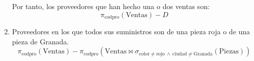 \begin{ejercicio}
\begin{enumerate}
        Por tanto, los proveedores que han hecho una o dos ventas son:
        \begin{equation*}
            \pi_{\text{codpro}}(\text{Ventas}) - D
        \end{equation*}

        \item Proveedores en los que todos sus suministros son de una pieza roja o de una pieza de Granada.
        \begin{equation*}
            \pi_{\text{codpro}}(\text{Ventas}) - \pi_{\text{codpro}}(\text{Ventas} \bowtie \sigma_{\text{color}\neq \text{rojo} ~\land~ \text{ciudad}\neq \text{Granada}}(\text{Piezas}))
        \end{equation*}
    \end{enumerate}
    
\end{ejercicio}